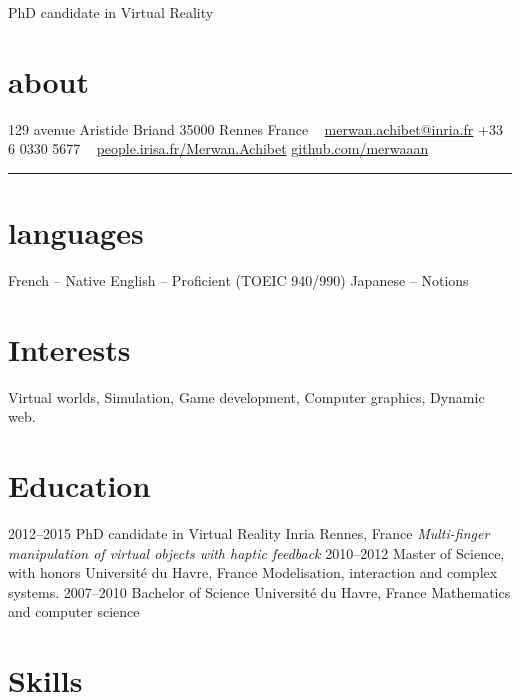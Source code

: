 \documentclass[]{friggeri-cv}
\begin{document}
       {PhD candidate in Virtual Reality}

\begin{aside}
  \section{about}\vspace{.25cm}
    129 avenue Aristide Briand
    35000 Rennes
    France
    ~
    \href{mailto:merwan.achibet@inria.fr}{merwan.achibet@inria.fr}
    +33 6 0330 5677
		~
    \href{http://people.irisa.fr/Merwan.Achibet/}{people.irisa.fr/Merwan.Achibet}
    \href{http://github.com/merwaaan}{github.com/merwaaan}
    {\color{lightergray}\rule{3cm}{0.01cm}}
	\section{languages}\vspace{.25cm}
		French {\footnotesize -- Native}\vspace{.4cm}
		English {\footnotesize -- Proficient}
		{\footnotesize (TOEIC 940/990)}\vspace{.4cm}
		Japanese {\footnotesize -- Notions}
\end{aside}

\section{Interests}

Virtual worlds, Simulation, Game development, Computer graphics, Dynamic web.

\section{Education}

\begin{entrylist}
  \entry
    {2012–2015}
    {PhD candidate in Virtual Reality}
    {Inria Rennes, France}
    {\it Multi-finger manipulation of virtual objects with haptic feedback}
  \entry
    {2010–2012}
    {Master of Science, with honors}
    {Université du Havre, France}
    {Modelisation, interaction and complex systems.}
  \entry
    {2007–2010}
    {Bachelor of Science}
    {Université du Havre, France}
		{Mathematics and computer science}
\end{entrylist}

\section{Skills}
\end{document}
